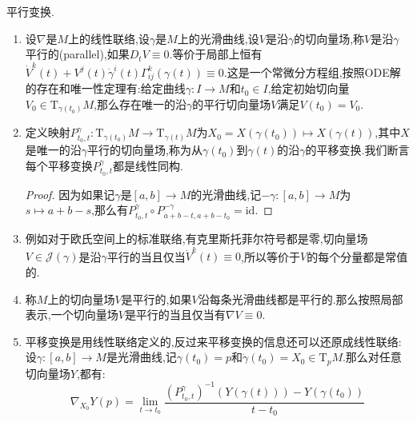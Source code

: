 平行变换.
\begin{enumerate}
	\item 设$\nabla$是$M$上的线性联络,设$\gamma$是$M$上的光滑曲线,设$V$是沿$\gamma$的切向量场,称$V$是沿$\gamma$平行的(parallel),如果$D_tV\equiv0$.等价于局部上恒有$\dot{V}^k(t)+V^j(t)\dot{\gamma}^i(t)\Gamma_{ij}^k(\gamma(t))\equiv0$.这是一个常微分方程组,按照ODE解的存在和唯一性定理有:给定曲线$\gamma:I\to M$和$t_0\in I$,给定初始切向量$V_0\in\mathrm{T}_{\gamma(t_0)}M$,那么存在唯一的沿$\gamma$的平行切向量场$V$满足$V(t_0)=V_0$.
	\item 定义映射$P^{\gamma}_{t_0,t}:\mathrm{T}_{\gamma(t_0)}M\to\mathrm{T}_{\gamma(t)}M$为$X_0=X(\gamma(t_0))\mapsto X(\gamma(t))$,其中$X$是唯一的沿$\gamma$平行的切向量场,称为从$\gamma(t_0)$到$\gamma(t)$的沿$\gamma$的平移变换.我们断言每个平移变换$P_{t_0,t}^{\gamma}$都是线性同构.
	\begin{proof}
		
		因为如果记$\gamma$是$[a,b]\to M$的光滑曲线,记$-\gamma:[a,b]\to M$为$s\mapsto a+b-s$,那么有$P_{t_0,t}^{\gamma}\circ P_{a+b-t,a+b-t_0}^{-\gamma}=\mathrm{id}$.
	\end{proof}
	\item 例如对于欧氏空间上的标准联络,有克里斯托菲尔符号都是零,切向量场$V\in\mathscr{J}(\gamma)$是沿$\gamma$平行的当且仅当$\dot{V}^k(t)\equiv0$,所以等价于$V$的每个分量都是常值的.
	\item 称$M$上的切向量场$V$是平行的,如果$V$沿每条光滑曲线都是平行的.那么按照局部表示,一个切向量场$V$是平行的当且仅当有$\nabla V\equiv0$.
	\item 平移变换是用线性联络定义的,反过来平移变换的信息还可以还原成线性联络:设$\gamma:[a,b]\to M$是光滑曲线,记$\gamma(t_0)=p$和$\dot{\gamma}(t_0)=X_0\in\mathrm{T}_pM$.那么对任意切向量场$Y$,都有:
	$$\nabla_{X_0}Y(p)=\lim\limits_{t\to t_0}\frac{(P^{\gamma}_{t_0,t})^{-1}(Y(\gamma(t)))-Y(\gamma(t_0))}{t-t_0}$$
\end{enumerate}

